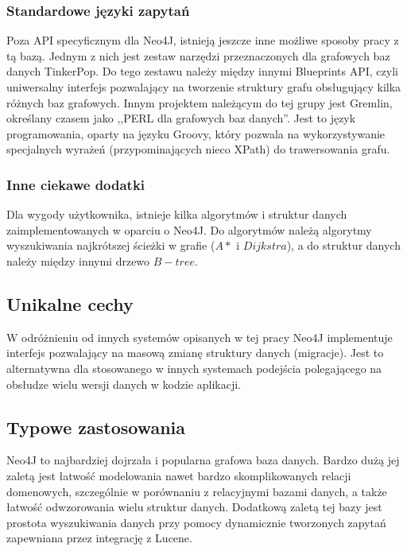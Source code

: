 \subsubsection*{Standardowe języki zapytań}

Poza API specyficznym dla Neo4J, istnieją jeszcze inne możliwe sposoby pracy z tą bazą.
Jednym z nich jest zestaw narzędzi przeznaczonych dla grafowych baz danych TinkerPop.
Do tego zestawu należy między innymi Blueprints API, czyli uniwersalny interfejs pozwalający na tworzenie struktury grafu obsługujący kilka różnych baz grafowych.
Innym projektem należącym do tej grupy jest Gremlin, określany czasem jako ,,PERL dla grafowych baz danych''.
Jest to język programowania, oparty na języku Groovy, który pozwala na wykorzystywanie specjalnych wyrażeń (przypominających nieco XPath) do trawersowania grafu.

\subsubsection*{Inne ciekawe dodatki}

Dla wygody użytkownika, istnieje kilka algorytmów i struktur danych zaimplementowanych w oparciu o Neo4J.
Do algorytmów należą algorytmy wyszukiwania najkrótszej ścieżki w grafie ($A*$ i $Dijkstra$), a do struktur danych należy między innymi drzewo $B-tree$.

\subsection*{Unikalne cechy}

W odróżnieniu od innych systemów opisanych w tej pracy Neo4J implementuje interfejs pozwalający na masową zmianę struktury danych (migracje).
Jest to alternatywna dla stosowanego w innych systemach podejścia polegającego na obsłudze wielu wersji danych w kodzie aplikacji.

\subsection*{Typowe zastosowania}

Neo4J to najbardziej dojrzała i popularna grafowa baza danych.
Bardzo dużą jej zaletą jest łatwość modelowania nawet bardzo skomplikowanych relacji domenowych, szczególnie w porównaniu z relacyjnymi bazami danych, a także łatwość odwzorowania wielu struktur danych.
Dodatkową zaletą tej bazy jest prostota wyszukiwania danych przy pomocy dynamicznie tworzonych zapytań zapewniana przez integrację z Lucene.

